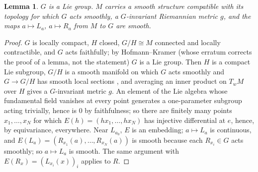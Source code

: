 \documentclass[11pt,reqno]{amsart}
\newtheorem{lemma}[theorem]{Lemma}
\theoremstyle{definition}
\theoremstyle{remark}
\numberwithin{equation}{section}
\begin{document}
\begin{lemma}\label{lem:roundLie}
$G$ is a Lie group.  $M$ carries a smooth structure compatible with its topology for which $G$ acts smoothly, a $G$-invariant
Riemannian metric $g$, and the maps $a\mapsto L_a$, $a\mapsto R_a$ from $M$ to $G$ are smooth.
\end{lemma}
\begin{proof}
$G$ is locally compact, $H$ closed, $G/H\cong M$ connected and locally contractible, and $G$ acts faithfully; by Hofmann--Kramer
\cite[Thm.~5.4]{HK15} (whose erratum \cite{HK15e} corrects the proof of a lemma, not the statement) $G$ is a Lie group.  Then $H$ is a compact
Lie subgroup, $G/H$ is a smooth manifold on which $G$ acts smoothly and $G\to G/H$ has smooth local sections \cite[Ch.~21]{Lee13}, and
averaging an inner product on $T_wM$ over $H$ gives a $G$-invariant metric $g$.  An element of the Lie algebra whose fundamental field
vanishes at every point generates a one-parameter subgroup acting trivially, hence is $0$ by faithfulness; so there are finitely many
points $x_1,\dots,x_N$ for which $E(h)=(hx_1,\dots,hx_N)$ has injective differential at $e$, hence, by equivariance, everywhere.  Near
$L_{a_0}$, $E$ is an embedding; $a\mapsto L_a$ is continuous, and $E(L_a)=(R_{x_1}(a),\dots,R_{x_N}(a))$ is smooth because each $R_{x_i}\in G$
acts smoothly; so $a\mapsto L_a$ is smooth.  The same argument with $E(R_x)=(L_{x_i}(x))_i$ applies to $R$.
\end{proof}
\end{document}
